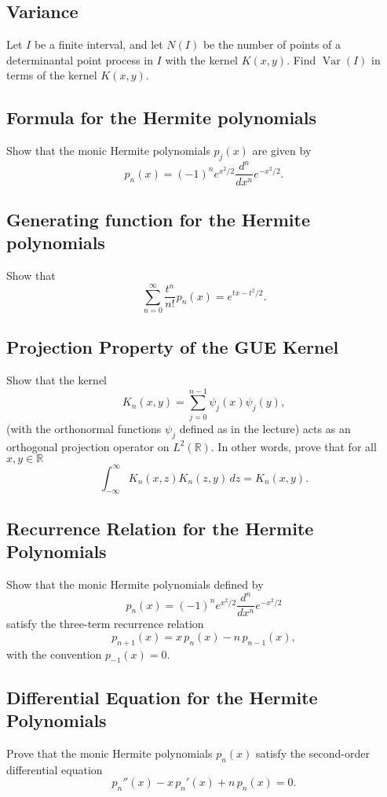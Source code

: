 \documentclass[letterpaper,11pt,oneside,reqno]{article}
\numberwithin{equation}{section}
\newcommand{\ssp}{\hspace{1pt}}
\theoremstyle{definition}
\begin{document}
\subsection{Variance}

Let $I$ be a finite interval,
and let $N(I)$ be the number of points of a determinantal point process in $I$
with the kernel $K(x,y)$.
Find $\operatorname{Var}(I)$
in terms of the kernel $K(x,y)$.


\subsection{Formula for the Hermite polynomials}

Show that the monic Hermite polynomials \(p_j(x)\) are given by
\begin{equation*}
	p_n(x)=(-1)^n e^{x^2/2}\frac{d^n}{dx^n}e^{-x^2/2}.
\end{equation*}

\subsection{Generating function for the Hermite polynomials}

Show that
\begin{equation*}
	\sum_{n=0}^\infty \frac{t^n}{n!} \ssp p_n(x)=e^{tx-t^2/2}.
\end{equation*}


\subsection{Projection Property of the GUE Kernel}
Show that the kernel
\[
K_n(x,y)=\sum_{j=0}^{n-1}\psi_j(x)\psi_j(y),
\]
(with the orthonormal functions \(\psi_j\) defined as in the lecture) acts as an orthogonal projection operator on \(L^2(\mathbb{R})\). In other words, prove that for all \(x,y\in\mathbb{R}\)
\[
\int_{-\infty}^\infty K_n(x,z)K_n(z,y)\,dz = K_n(x,y).
\]


\subsection{Recurrence Relation for the Hermite Polynomials}
Show that the monic Hermite polynomials defined by
\[
	p_n(x)=(-1)^n e^{x^2/2}\frac{d^n}{dx^n}e^{-x^2/2}
\]
satisfy the three-term recurrence relation
\[
p_{n+1}(x)=x\,p_n(x)-n\,p_{n-1}(x),
\]
with the convention \(p_{-1}(x)=0\).

\subsection{Differential Equation for the Hermite Polynomials}
Prove that the monic Hermite polynomials \(p_n(x)\) satisfy the second-order differential equation
\[
p_n''(x)-x\,p_n'(x)+n\,p_n(x)=0.
\]
\end{document}
